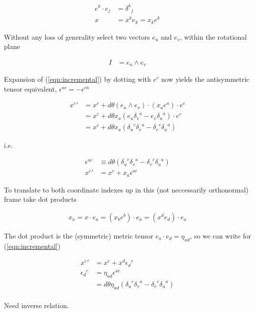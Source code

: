 \begin{align*}
e^k \cdot e_j &= {\delta^k}_j \\
x &= x^k e_k = x_k e^k
\end{align*}

Without any loss of generality select two vectors $e_u$ and $e_v$, within the rotational plane

\begin{align*}
I &= e_u \wedge e_v
\end{align*}

Expansion of (\ref{eqn:incremental}) by dotting with $e^c$ now yields the 
antisymmetric tensor equivalent, $\epsilon^{a c} = -\epsilon^{c a}$

\begin{align*}
{x^c}' 
&= x^c + {d\theta} (e_u \wedge e_v) \cdot (x_a e^a) \cdot e^c \\
&= x^c + {d\theta} x_a ( e_u {\delta_v}^a -e_v {\delta_u}^a ) \cdot e^c \\
&= x^c + {d\theta} x_a ( {\delta_u}^c {\delta_v}^a - {\delta_v}^c {\delta_u}^a ) 
\end{align*}

i.e.

\begin{align*}
\epsilon^{a c} &\equiv d\theta ({\delta_u}^c {\delta_v}^a - {\delta_v}^c {\delta_u}^a )  \\
{x^c}' &= x^c + x_a \epsilon^{a c}
\end{align*}

To translate to both coordinate indexes up in this (not neccessarily orthonormal) frame take 
dot products

\begin{align*}
x_a = x \cdot e_a = (x_b e^b) \cdot e_a = (x^d e_d) \cdot e_a
\end{align*}

The dot product is the (symmetric) metric tensor $e_a \cdot e_d = \eta_{a d}$, so we can 
write for (\ref{eqn:incremental})

\begin{align*}
{x^c}' &= x^c + x^d {\epsilon_{d}}^c \\
{\epsilon_d}^c 
&= \eta_{a d} \epsilon^{a c} \\
&= d\theta \eta_{a d} ({\delta_u}^c {\delta_v}^a - {\delta_v}^c {\delta_u}^a )  \\
\end{align*}

Need inverse relation.

\EndArticle

